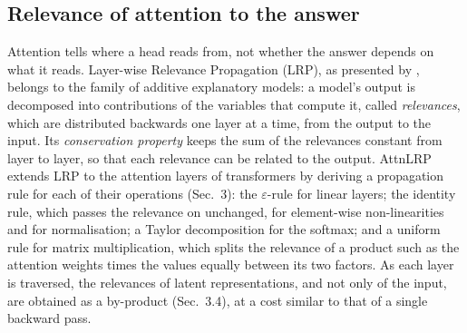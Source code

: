 \documentclass[10pt,a4paper]{article}
\begin{document}
\subsection{Relevance of attention to the answer}\label{sec:bg-lrp}

Attention tells where a head reads from, not whether the answer depends on what it reads. Layer-wise Relevance Propagation (LRP), as presented by \citet[Sec.~3.1]{achtibat2024attnlrp}, belongs to the family of additive explanatory models: a model's output is decomposed into contributions of the variables that compute it, called \emph{relevances}, which are distributed backwards one layer at a time, from the output to the input. Its \emph{conservation property} keeps the sum of the relevances constant from layer to layer, so that each relevance can be related to the output. AttnLRP \citep{achtibat2024attnlrp} extends LRP to the attention layers of transformers by deriving a propagation rule for each of their operations (Sec.~3): the $\varepsilon$-rule for linear layers; the identity rule, which passes the relevance on unchanged, for element-wise non-linearities and for normalisation; a Taylor decomposition for the softmax; and a uniform rule for matrix multiplication, which splits the relevance of a product such as the attention weights times the values equally between its two factors. As each layer is traversed, the relevances of latent representations, and not only of the input, are obtained as a by-product (Sec.~3.4), at a cost similar to that of a single backward pass.
\end{document}

